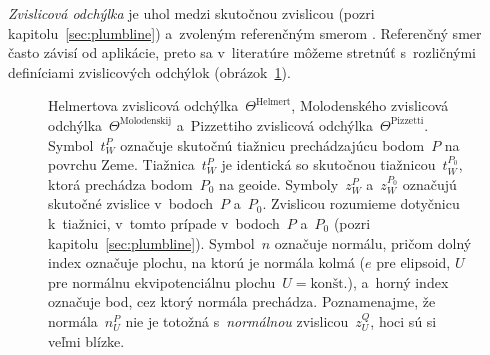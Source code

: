 \documentclass[a4paper, 12pt]{book}
\begin{document}
\emph{Zvislicová odchýlka} je uhol medzi skutočnou zvislicou (pozri 
kapitolu~\ref{sec:plumbline}) a~zvoleným referenčným smerom 
\parencite{TorgeGeodesy}.  Referenčný smer často závisí od aplikácie, preto sa 
v~literatúre môžeme stretnúť s~rozličnými definíciami zvislicových odchýlok 
(obrázok~\ref{fig:deflections}).

\begin{figure}[bt]
\centering

\caption{Helmertova zvislicová odchýlka~$\Theta^\textrm{Helmert}$, Molodenského 
zvislicová odchýlka~$\Theta^\textrm{Molodenskij}$ a~Pizzettiho zvislicová 
odchýlka~$\Theta^\textrm{Pizzetti}$.  Symbol~$t_W^P$ označuje skutočnú tiažnicu 
prechádzajúcu bodom~$P$ na povrchu Zeme.  Tiažnica~$t_W^P$ je identická so 
skutočnou tiažnicou~$t_W^{P_0}$, ktorá prechádza bodom~$P_0$ na geoide.  
Symboly~$z_W^P$ a~$z_W^{P_0}$ označujú skutočné zvislice v~bodoch~$P$ a~$P_0$.  
Zvislicou rozumieme dotyčnicu k~tiažnici, v~tomto prípade v~bodoch~$P$ a~$P_0$ 
(pozri kapitolu~\ref{sec:plumbline}).  Symbol~$n$ označuje normálu, pričom 
dolný index označuje plochu, na ktorú je normála kolmá ($e$ pre elipsoid, $U$ 
pre normálnu ekvipotenciálnu plochu~$U = \textrm{kon\v{s}t.}$), a~horný index 
označuje bod, cez ktorý normála prechádza.  Poznamenajme, že normála~$n_U^P$ 
nie je totožná s~\emph{normálnou} zvislicou~$z_U^Q$, hoci sú si veľmi blízke.}
\label{fig:deflections}
\end{figure}
\end{document}
